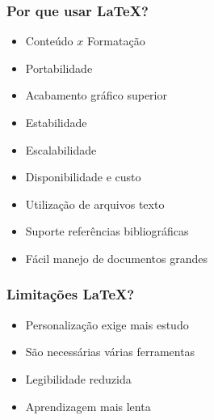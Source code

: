 \begin{frame}
\frametitle{Por que usar \LaTeX?}

\begin{itemize}
  \item Conteúdo $x$ Formatação 
  \item Portabilidade
  \item Acabamento gráfico superior
  \item Estabilidade
  \item Escalabilidade
  \item Disponibilidade e custo
  \item Utilização de arquivos texto
  \item Suporte referências bibliográficas
  \item Fácil manejo de documentos grandes
\end{itemize}
 
\end{frame}

\begin{frame}
\frametitle{Limitações \LaTeX?}

\begin{itemize}
  \item Personalização exige mais estudo
  \item São necessárias várias ferramentas 
  \item Legibilidade reduzida 
  \item Aprendizagem mais lenta
\end{itemize}
 
\end{frame}


